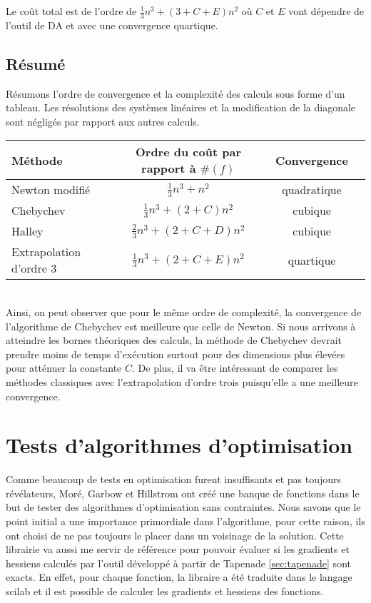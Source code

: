 Le coût total est de l'ordre de $\frac{1}{3}n^3 +(3+C+E)n^2$ o\`u $C$ et $E$ vont d\'ependre de l'outil de DA et avec une convergence
quartique.



\subsection{R\'esum\'e}
R\'esumons l'ordre de convergence et la complexit\'e des calculs sous forme d'un tableau. Les r\'esolutions des syst\`emes lin\'eaires
et la modification de la diagonale sont n\'eglig\'es par rapport aux autres calculs.\\

\begin{tabular}{|l|c|c|c|}\hline
M\'ethode & Ordre du coût par rapport \`a $\#(f)$ & Convergence \\
\hline
Newton modifi\'e& $\frac{1}{3}n^3+n^2$ & quadratique\\
Chebychev & $\frac{1}{3}n^3+(2+C)n^2$  & cubique \\
Halley & $\frac{2}{3}n^3+(2+C+D)n^2$ & cubique \\
Extrapolation d'ordre 3 & $\frac{1}{3}n^3 +(2+C+E)n^2$  & quartique \\
\hline
\end{tabular}\\


\noindent
Ainsi, on peut observer que pour le même ordre de complexit\'e, la convergence de l'algorithme de
Chebychev est meilleure que celle de Newton. Si nous arrivons \`a atteindre les bornes th\'eoriques des calculs, la m\'ethode
de Chebychev devrait prendre moins de temps d'ex\'ecution surtout pour des dimensions plus \'elev\'ees pour att\'enuer la constante $C$.
De plus, il va être int\'eressant de comparer les m\'ethodes classiques avec l'extrapolation d'ordre trois puisqu'elle a une meilleure
convergence.





\section{Tests d'algorithmes d'optimisation}

Comme beaucoup de tests en optimisation furent insuffisants et pas toujours r\'ev\'elateurs, Mor\'e, Garbow et Hillstrom
ont cr\'e\'e une banque de fonctions dans le but de tester des algorithmes d'optimisation sans contraintes.
 Nous savons que le point initial a une importance primordiale dans l'algorithme, pour cette raison, ils ont choisi de ne
pas toujours le placer dans un voisinage de la solution.
Cette librairie va aussi me servir de r\'ef\'erence pour pouvoir \'evaluer si les gradients et hessiens calcul\'es par l'outil d\'evelopp\'e \`a partir de Tapenade \ref{sec:tapenade}
 sont exacts. En effet, pour chaque fonction, la libraire a \'et\'e traduite dans le langage scilab et il est possible de calculer les gradients
et hessiens des fonctions.



